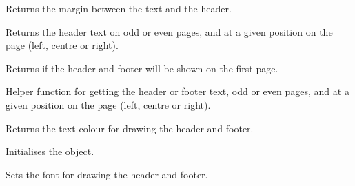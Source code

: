 
Returns the margin between the text and the header.

\label{wxrichtextheaderfooterdatagetheadertext}


Returns the header text on odd or even pages, and at a given position on the page (left, centre or right).

\label{wxrichtextheaderfooterdatagetshowonfirstpage}


Returns \true if the header and footer will be shown on the first page.

\label{wxrichtextheaderfooterdatagettext}


Helper function for getting the header or footer text, odd or even pages, and at a given position on the page (left, centre or right).

\label{wxrichtextheaderfooterdatagettextcolour}


Returns the text colour for drawing the header and footer.

\label{wxrichtextheaderfooterdatainit}


Initialises the object.

\label{wxrichtextheaderfooterdatasetfont}


Sets the font for drawing the header and footer.

\label{wxrichtextheaderfooterdatasetfootertext}


